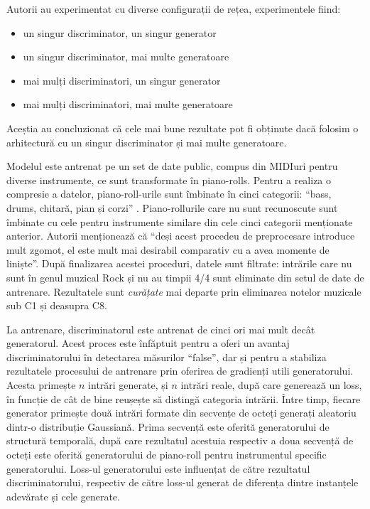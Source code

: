 Autorii au experimentat cu diverse configurații de rețea, experimentele fiind:

\begin{itemize}
    \item un singur discriminator, un singur generator
    \item un singur discriminator, mai multe generatoare
    \item mai mulți discriminatori, un singur generator
    \item mai mulți discriminatori, mai multe generatoare
\end{itemize}

Aceștia au concluzionat că cele mai bune rezultate pot fi obținute dacă folosim o arhitectură cu un singur discriminator și mai multe generatoare.

Modelul este antrenat pe un set de date public, compus din MIDIuri pentru diverse instrumente, ce sunt transformate în piano-rolls. Pentru a realiza o compresie a datelor, piano-roll-urile sunt îmbinate în cinci categorii: ``bass, drums, chitară, pian și corzi'' \cite{dong2017museganmultitracksequentialgenerative}. Piano-rollurile care nu sunt recunoscute sunt îmbinate cu cele pentru instrumente similare din cele cinci categorii menționate anterior. Autorii menționează că ``deși acest procedeu de preprocesare introduce mult zgomot, el este mult mai desirabil comparativ cu a avea momente de liniște''. După finalizarea acestei proceduri, datele sunt filtrate: intrările care nu sunt în genul muzical Rock și nu au timpii 4/4 sunt eliminate din setul de date de antrenare. Rezultatele sunt \textit{curățate} mai departe prin eliminarea notelor muzicale sub C1 și deasupra C8.

La antrenare, discriminatorul este antrenat de cinci ori mai mult decât generatorul. Acest proces este înfăptuit pentru a oferi un avantaj discriminatorului în detectarea măsurilor ``false'', dar și pentru a stabiliza rezultatele procesului de antrenare prin oferirea de gradienți utili generatorului. Acesta primește $n$ intrări generate, și $n$ intrări reale, după care generează un loss, în funcție de cât de bine reușește să distingă categoria intrării. Între timp, fiecare generator primește două intrări formate din secvențe de octeți generați aleatoriu dintr-o distribuție Gaussiană. Prima secvență este oferită generatorului de structură temporală, după care rezultatul acestuia respectiv a doua secvență de octeți este oferită generatorului de piano-roll pentru instrumentul specific generatorului. Loss-ul generatorului este influențat de către rezultatul discriminatorului, respectiv de către loss-ul generat de diferența dintre instanțele adevărate și cele generate.

